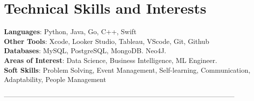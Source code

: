 \documentclass[a4paper,11pt]{article}
\begin{document}
\section{\textbf{Technical Skills and Interests}}
 \begin{itemize}[leftmargin=0.05in, label={}]
    \small{\item{
     \textbf{Languages}{: Python, Java, Go, C++, Swift} \\
     \textbf{Other Tools}{: Xcode, Looker Studio, Tableau, VScode, Git, Github} \\ 
     \textbf{Databases}{: MySQL, PostgreSQL, MongoDB. Neo4J.} \\  
     \textbf{Areas of Interest}{: Data Science, Business Intelligence, ML Engineer.} \\
     \textbf{Soft Skills}{: Problem Solving, Event Management, Self-learning, Communication, Adaptability, People Management} \\
    }}
 \end{itemize}
 \vspace{-16pt}

-----------------------------------------------------------------------------------------------------
\end{document}
